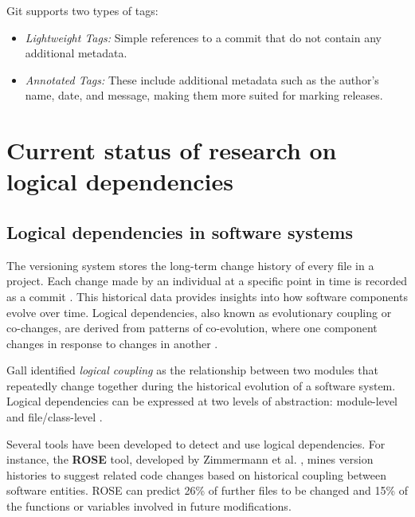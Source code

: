 Git supports two types of tags:
\begin{itemize}
    \item \textit{Lightweight Tags:} Simple references to a commit that do not contain any additional metadata.
    \item \textit{Annotated Tags:} These include additional metadata such as the author's name, date, and message, making them more suited for marking releases.
\end{itemize}



\section{Current status of research on logical dependencies}
\label{ld-intro}

\subsection{Logical dependencies in software systems}

\hspace{4em}The versioning system stores the long-term change history of every file in a project. Each change made by an individual at a specific point in time is recorded as a commit \cite{7471284}. This historical data provides insights into how software components evolve over time. Logical dependencies, also known as evolutionary coupling or co-changes, are derived from patterns of co-evolution, where one component changes in response to changes in another \cite{Yu:2007:UCC:1231330.1231370, 5166450, Beck:2011:CMC:2025113.2025162}.

Gall \cite{Gall:1998:DLC:850947.853338, Gall:2003:CRH:942803.943741, 6606615} identified \textit{logical coupling} as the relationship between two modules that repeatedly change together during the historical evolution of a software system. Logical dependencies can be expressed at two levels of abstraction: module-level \cite{LD-module-new} and file/class-level \cite{Gall:2003:CRH:942803.943741, inproceedings-gall}.

Several tools have been developed to detect and use logical dependencies. For instance, the \textbf{ROSE} tool, developed by Zimmermann et al. \cite{Zimmermann:2004:MVH:998675.999460}, mines version histories to suggest related code changes based on historical coupling between software entities. ROSE can predict 26\% of further files to be changed and 15\% of the functions or variables involved in future modifications.

